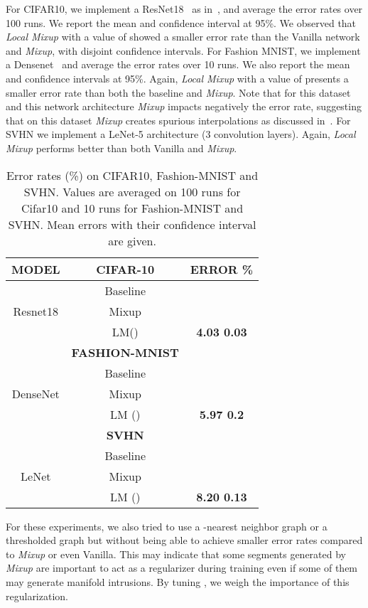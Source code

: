 \documentclass[twoside]{article}
\numberwithin{intassumption}{assumption}
\begin{document}
For CIFAR10, we implement a ResNet18~\citep{resnet} as in~\citep{zhang2017mixup}, and average the error rates over 100 runs. We report the mean and confidence interval at 95\%. We observed that \emph{Local Mixup} with a value of  showed a smaller error rate than the Vanilla network and \emph{Mixup}, with disjoint confidence intervals.
For Fashion MNIST, we implement a Densenet~\citep{densenet} and average the error rates over 10 runs. We also report the mean and confidence intervals at 95\%. Again, \emph{Local Mixup} with a value of  presents a smaller error rate than both the baseline and \emph{Mixup}. Note that for this dataset and this network architecture \emph{Mixup} impacts negatively the error rate, suggesting that on this dataset \emph{Mixup} creates spurious interpolations as discussed in~\cite{guo2019mixup}.
For SVHN we implement a LeNet-5\citep{lenet} architecture (3 convolution layers). Again, \emph{Local Mixup} performs better than both Vanilla and \emph{Mixup}.
\begin{table}[]
    \centering
        \caption{Error rates (\%) on CIFAR10, Fashion-MNIST and SVHN. Values are averaged on 100 runs for Cifar10 and 10 runs for Fashion-MNIST and SVHN. Mean errors with their confidence interval are given.}
    \begin{tabular}{c c c}
     \hline
    \textbf{MODEL} & \textbf{CIFAR-10} & \textbf{ERROR \%} \\
    \hline
&Baseline &   \\
Resnet18 &Mixup &    \\
&LM() & \textbf{ 4.03  0.03}\\
\hline 
&\textbf{FASHION-MNIST}&  \\
\hline 
&Baseline &   \\
DenseNet&Mixup &    \\
&LM () & \textbf{5.97  0.2} \\
\hline
&\textbf{SVHN}&  \\ 
\hline
&Baseline &   \\
LeNet &Mixup &    \\
&LM () & \textbf{8.20  0.13} \\
    \end{tabular}
    \label{tab:ErrCifar10}
\vspace{-0.1cm}
\end{table}

For these experiments, we also tried to use a -nearest neighbor graph or a thresholded graph but without being able to achieve smaller error rates compared to \emph{Mixup} or even Vanilla. This may indicate that some segments generated by \emph{Mixup} are important to act as a regularizer during training even if some of them may generate manifold intrusions. By tuning , we weigh the importance of this regularization.
\end{document}
